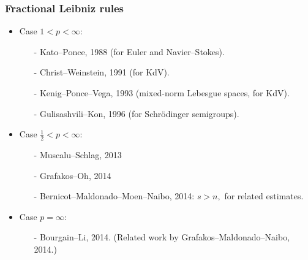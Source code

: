 \documentclass[xcolor=dvipsnames]{beamer}
\begin{document}
\begin{frame}\frametitle{Fractional Leibniz rules}
\begin{itemize}
\item Case $1<p<\infty:$ 
\begin{enumerate}[-]
\item[-] Kato--Ponce, 1988 (for Euler and Navier--Stokes).%

\medskip

\item[-] Christ--Weinstein, 1991 (for KdV).%

\medskip

\item[-] Kenig--Ponce--Vega, 1993 (mixed-norm Lebesgue spaces, for KdV).%

\medskip

\item[-] Gulisashvili--Kon, 1996 (for Schr\"odinger semigroups).

\end{enumerate}

\medskip 

\item Case $\frac{1}{2}<p<\infty:$  
\begin{enumerate}[-]
\item[-] Muscalu--Schlag, 2013%
\medskip
\item[-] Grafakos--Oh, 2014 
\medskip
\item[-] Bernicot--Maldonado--Moen--Naibo, 2014: $s>n,$ for related estimates.  
\end{enumerate}

\medskip 

\item Case $p=\infty:$ 
\begin{enumerate}[-]
\item[-]  Bourgain--Li, 2014. (Related work by Grafakos--Maldonado--Naibo, 2014.)
\end{enumerate}
\end{itemize}
\end{frame}
\end{document}
